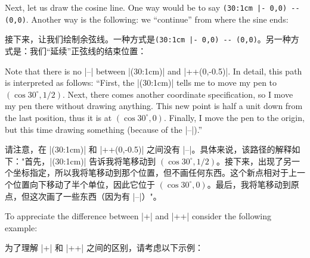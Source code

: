 Next, let us draw the cosine line. One way would be to say
\verb!(30:1cm |- 0,0) -- (0,0)!. Another way is the following: we ``continue''
from where the sine ends:
%

接下来，让我们绘制余弦线。一种方式是\verb!(30:1cm |- 0,0) -- (0,0)!。另一种方式是：我们``延续''正弦线的结束位置：

\begin{codeexample}[]
\end{codeexample}

Note that there is no |--| between |(30:1cm)| and |++(0,-0.5)|. In detail, this
path is interpreted as follows: ``First, the |(30:1cm)| tells me to move my pen
to $(\cos 30^\circ,1/2)$. Next, there comes another coordinate specification,
so I move my pen there without drawing anything. This new point is half a unit
down from the last position, thus it is at $(\cos 30^\circ,0)$. Finally, I move
the pen to the origin, but this time drawing something (because of the |--|).''

请注意，在 |(30:1cm)| 和 |++(0,-0.5)| 之间没有 |--|。具体来说，该路径的解释如下："首先，|(30:1cm)| 告诉我将笔移动到 $(\cos 30^\circ,1/2)$。接下来，出现了另一个坐标指定，所以我将笔移动到那个位置，但不画任何东西。这个新点相对于上一个位置向下移动了半个单位，因此它位于 $(\cos 30^\circ,0)$。最后，我将笔移动到原点，但这次画了一些东西（因为有 |--|）"。



To appreciate the difference between |+| and |++| consider the following
example:


为了理解 |+| 和 |++| 之间的区别，请考虑以下示例：%
%
\begin{codeexample}[]
\end{codeexample}

